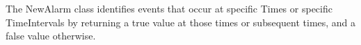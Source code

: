 
\label{sec:NewAlarm}
The NewAlarm class identifies events that occur at specific Times
or specific TimeIntervals by returning a true value at those times
or subsequent times, and a false value otherwise.  

